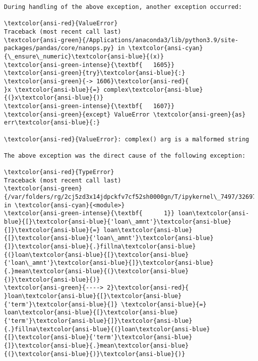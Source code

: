 \documentclass[11pt]{article}
\begin{document}
\begin{Verbatim}[commandchars=\\\{\}, frame=single, framerule=2mm, rulecolor=\color{outerrorbackground}]
During handling of the above exception, another exception occurred:

\textcolor{ansi-red}{ValueError}                                Traceback (most recent call last)
\textcolor{ansi-green}{/Applications/anaconda3/lib/python3.9/site-packages/pandas/core/nanops.py} in \textcolor{ansi-cyan}{\_ensure\_numeric}\textcolor{ansi-blue}{(x)}
\textcolor{ansi-green-intense}{\textbf{   1605}}             \textcolor{ansi-green}{try}\textcolor{ansi-blue}{:}
\textcolor{ansi-green}{-> 1606}\textcolor{ansi-red}{                 }x \textcolor{ansi-blue}{=} complex\textcolor{ansi-blue}{(}x\textcolor{ansi-blue}{)}
\textcolor{ansi-green-intense}{\textbf{   1607}}             \textcolor{ansi-green}{except} ValueError \textcolor{ansi-green}{as} err\textcolor{ansi-blue}{:}

\textcolor{ansi-red}{ValueError}: complex() arg is a malformed string

The above exception was the direct cause of the following exception:

\textcolor{ansi-red}{TypeError}                                 Traceback (most recent call last)
\textcolor{ansi-green}{/var/folders/rg/2cj5zd3x14jdpckfv7cf52sh0000gn/T/ipykernel\_7497/3269742543.py} in \textcolor{ansi-cyan}{<module>}
\textcolor{ansi-green-intense}{\textbf{      1}} loan\textcolor{ansi-blue}{[}\textcolor{ansi-blue}{'loan\_amnt'}\textcolor{ansi-blue}{]}\textcolor{ansi-blue}{=} loan\textcolor{ansi-blue}{[}\textcolor{ansi-blue}{'loan\_amnt'}\textcolor{ansi-blue}{]}\textcolor{ansi-blue}{.}fillna\textcolor{ansi-blue}{(}loan\textcolor{ansi-blue}{[}\textcolor{ansi-blue}{'loan\_amnt'}\textcolor{ansi-blue}{]}\textcolor{ansi-blue}{.}mean\textcolor{ansi-blue}{(}\textcolor{ansi-blue}{)}\textcolor{ansi-blue}{)}
\textcolor{ansi-green}{----> 2}\textcolor{ansi-red}{ }loan\textcolor{ansi-blue}{[}\textcolor{ansi-blue}{'term'}\textcolor{ansi-blue}{]} \textcolor{ansi-blue}{=} loan\textcolor{ansi-blue}{[}\textcolor{ansi-blue}{'term'}\textcolor{ansi-blue}{]}\textcolor{ansi-blue}{.}fillna\textcolor{ansi-blue}{(}loan\textcolor{ansi-blue}{[}\textcolor{ansi-blue}{'term'}\textcolor{ansi-blue}{]}\textcolor{ansi-blue}{.}mean\textcolor{ansi-blue}{(}\textcolor{ansi-blue}{)}\textcolor{ansi-blue}{)}


\end{Verbatim}
\end{document}
